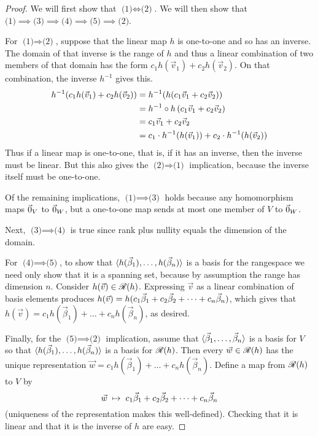 \begin{proof}
We will first show that \( \text{(1)} \Longleftrightarrow \text{(2)} \).
We will then show that
\(
  \text{(1)}\implies \text{(3)}\implies 
  \text{(4)}\implies \text{(5)}\implies \text{(2)}
\).

For \( \text{(1)} \Longrightarrow \text{(2)} \),
suppose that the linear map $h$ is one-to-one and so has an inverse.
The domain of that inverse is the range of $h$ and thus a linear combination
of  two members of that domain has the form $c_1h(\vec{v}_1)+c_2h(\vec{v}_2)$.
On that combination, the inverse \( h^{-1} \) gives this.
\begin{align*}
  h^{-1}(c_1h(\vec{v}_1)+c_2h(\vec{v}_2))
  &=h^{-1}(h(c_1\vec{v}_1+c_2\vec{v}_2))  \\
  &=h^{-1}\mathbin\circ h\,(c_1\vec{v}_1+c_2\vec{v}_2) \\
  &=c_1\vec{v}_1+c_2\vec{v}_2 \\
  &=c_1\cdot h^{-1}(h(\vec{v}_1))+c_2\cdot h^{-1}(h(\vec{v}_2))
\end{align*}
Thus if a linear map is one-to-one, that is, if it has an inverse, then
the inverse must be linear.
But this also gives the \( \text{(2)} \Longrightarrow \text{(1)} \) 
implication, because the inverse itself must be one-to-one.

Of the remaining implications,
\( \text{(1)}\implies \text{(3)} \) holds because any
homomorphism maps \( \vec{0}_V \) to \( \vec{0}_W \), but a one-to-one map sends at
most one member of \( V \) to \( \vec{0}_W \).

Next, \( \text{(3)} \implies \text{(4)} \) is true since rank
plus nullity equals the dimension of the domain.

For
\( \text{(4)} \implies \text{(5)} \), to show that
\( \langle h(\vec{\beta}_1),\dots,h(\vec{\beta}_n)\rangle \)
is a basis for the rangespace we need only show that it is a spanning set,
because by assumption the range has dimension $n$.
Consider $h(\vec{v})\in\mathscr{R}(h)$.
Expressing $\vec{v}$ as a linear combination of basis elements produces
\( h(\vec{v})=h(c_1\vec{\beta}_1+c_2\vec{\beta}_2+\cdots +c_n\vec{\beta}_n) \),
which gives that 
\( h(\vec{v})=c_1h(\vec{\beta}_1)+\dots+c_nh(\vec{\beta}_n) \),
as desired.

Finally, for the \( \text{(5)}\implies \text{(2)} \) implication, assume
that \( \langle\vec{\beta}_1,\dots,\vec{\beta}_n\rangle \)
is a basis for \( V \) so that
\( \langle h(\vec{\beta}_1),\dots,h(\vec{\beta}_n)\rangle \)
is a basis for \( \mathscr{R}(h) \).
Then every
\( \vec{w}\in\mathscr{R}(h) \) has the unique representation
\( \vec{w}=c_1h(\vec{\beta}_1)+\dots+c_nh(\vec{\beta}_n) \).
Define a map from \( \mathscr{R}(h) \) to $V$ by
\begin{equation*}
    \vec{w} \;\mapsto\; c_1\vec{\beta}_1+c_2\vec{\beta}_2+\cdots +c_n\vec{\beta}_n
\end{equation*}
(uniqueness of the representation makes this well-defined).
Checking that it is linear and that
it is the inverse of $h$ are easy.
\end{proof}

